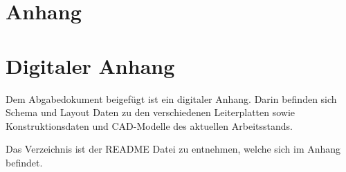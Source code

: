 \documentclass[main.tex]{subfiles} %
\begin{document}
\section{Anhang}
\appendix


\newpage


\newpage


\newpage


\newpage


\newpage


\newpage


\newpage


\newpage


\newpage


\newpage


\newpage

\section{Digitaler Anhang}
Dem Abgabedokument beigefügt ist ein digitaler Anhang. Darin befinden sich
Schema und Layout Daten zu den verschiedenen Leiterplatten sowie
Konstruktionsdaten und CAD-Modelle des aktuellen Arbeitsstands.

Das Verzeichnis ist der README Datei zu entnehmen, welche sich im Anhang
befindet.
\end{document}
